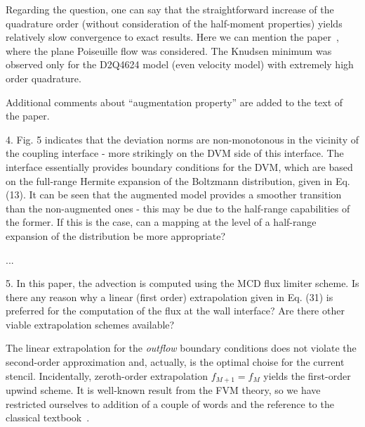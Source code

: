 \documentclass{article}
\begin{document}
Regarding the question, one can say that the straightforward increase of the quadrature order
(without consideration of the half-moment properties)
yields relatively slow convergence to exact results.
Here we can mention the paper~\cite{Meng2011accuracy},
where the plane Poiseuille flow was considered.
The Knudsen minimum was observed only for the D2Q4624 model (even velocity model)
with extremely high order quadrature.

Additional comments about ``augmentation property'' are added to the text of the paper.

\begin{leftbar}
\end{leftbar}

\begin{quoting}
    4. Fig. 5 indicates that the deviation norms are
    non-monotonous in the vicinity of the coupling
    interface - more strikingly on the DVM side of this
    interface. The interface essentially provides boundary
    conditions for the DVM, which are based on the
    full-range Hermite expansion of the Boltzmann
    distribution, given in Eq. (13). It can be seen that
    the augmented model provides a smoother transition than
    the non-augmented ones - this may be due to the
    half-range capabilities of the former. If this is
    the case, can a mapping at the level of a half-range
    expansion of the distribution be more appropriate?
\end{quoting}

...

\begin{leftbar}
\end{leftbar}

\begin{quoting}
    5. In this paper, the advection is computed using
    the MCD flux limiter scheme. Is there any reason why
    a linear (first order) extrapolation given in
    Eq. (31) is preferred for the computation of the
    flux at the wall interface? Are there other viable
    extrapolation schemes available?
\end{quoting}

The linear extrapolation for the \emph{outflow} boundary conditions
does not violate the second-order approximation
and, actually, is the optimal choise for the current stencil.
Incidentally, zeroth-order extrapolation \(f_{M+1} = f_M\) yields
the first-order upwind scheme. It is well-known result from the FVM theory,
so we have restricted ourselves to addition of a couple of words
and the reference to the classical textbook~\cite{LeVeque2002}.
\end{document}
